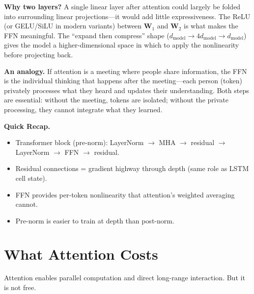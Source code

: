 \textbf{Why two layers?} A single linear layer after attention could largely be folded into surrounding linear projections---it would add little expressiveness. The ReLU (or GELU/SiLU in modern variants) between $\mathbf{W}_1$ and $\mathbf{W}_2$ is what makes the FFN meaningful. The ``expand then compress'' shape ($d_\text{model} \to 4d_\text{model} \to d_\text{model}$) gives the model a higher-dimensional space in which to apply the nonlinearity before projecting back.

\textbf{An analogy.} If attention is a meeting where people share information, the FFN is the individual thinking that happens after the meeting---each person (token) privately processes what they heard and updates their understanding. Both steps are essential: without the meeting, tokens are isolated; without the private processing, they cannot integrate what they learned.

\medskip
\noindent{}
\medskip

\begin{quickrecap}
\textbf{Quick Recap.}
\begin{itemize}[nosep,leftmargin=1.5em]
  \item Transformer block (pre-norm): LayerNorm $\to$ MHA $\to$ residual $\to$ LayerNorm $\to$ FFN $\to$ residual.
  \item Residual connections = gradient highway through depth (same role as LSTM cell state).
  \item FFN provides per-token nonlinearity that attention's weighted averaging cannot.
  \item Pre-norm is easier to train at depth than post-norm.
\end{itemize}
\end{quickrecap}


\section{What Attention Costs}

Attention enables parallel computation and direct long-range interaction. But it is not free.

